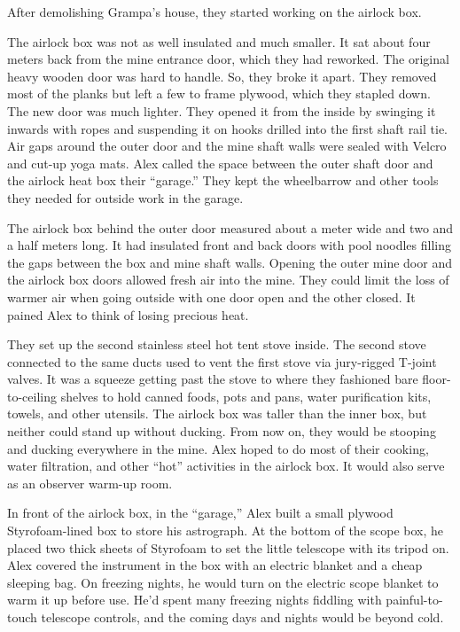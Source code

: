 After demolishing Grampa's house, they started working on the airlock
box.

The airlock box was not as well insulated and much smaller. It sat about
four meters back from the mine entrance door, which they had reworked.
The original heavy wooden door was hard to handle. So, they broke it
apart. They removed most of the planks but left a few to frame plywood,
which they stapled down. The new door was much lighter. They opened it
from the inside by swinging it inwards with ropes and suspending it on
hooks drilled into the first shaft rail tie. Air gaps around the outer
door and the mine shaft walls were sealed with Velcro and cut-up yoga
mats. Alex called the space between the outer shaft door and the airlock
heat box their ``garage.'' They kept the wheelbarrow and other tools
they needed for outside work in the garage.

The airlock box behind the outer door measured about a meter wide and
two and a half meters long. It had insulated front and back doors with
pool noodles filling the gaps between the box and mine shaft walls.
Opening the outer mine door and the airlock box doors allowed fresh air
into the mine. They could limit the loss of warmer air when going
outside with one door open and the other closed. It pained Alex to think
of losing precious heat.

They set up the second stainless steel hot tent stove inside. The second
stove connected to the same ducts used to vent the first stove via
jury-rigged T-joint valves. It was a squeeze getting past the stove to
where they fashioned bare floor-to-ceiling shelves to hold canned foods,
pots and pans, water purification kits, towels, and other utensils. The
airlock box was taller than the inner box, but neither could stand up
without ducking. From now on, they would be stooping and ducking
everywhere in the mine. Alex hoped to do most of their cooking, water
filtration, and other ``hot'' activities in the airlock box. It would
also serve as an observer warm-up room.

In front of the airlock box, in the ``garage,'' Alex built a small
plywood Styrofoam-lined box to store his astrograph. At the bottom of
the scope box, he placed two thick sheets of Styrofoam to set the little
telescope with its tripod on. Alex covered the instrument in the box
with an electric blanket and a cheap sleeping bag. On freezing nights,
he would turn on the electric scope blanket to warm it up before use.
He'd spent many freezing nights fiddling with painful-to-touch telescope
controls, and the coming days and nights would be beyond cold.

